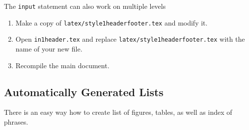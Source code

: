 \documentclass[a4paper,10pt]{report} %
\begin{document}
The \texttt{input} statement can also work on multiple levels
\begin{enumerate}
    \item Make a copy of \texttt{latex/style1headerfooter.tex} and modify it.
    \item Open \texttt{in1header.tex} and replace \texttt{latex/style1headerfooter.tex} with the name of your new file.
    \item Recompile the main document.
\end{enumerate}



\subsection{Automatically Generated Lists}\label{sec:automatic}
There is an easy way how to create list of figures, tables, as well as index of phrases. 

%  


%    

\end{document}
